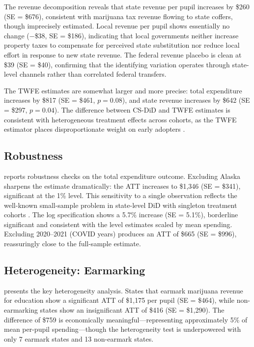 \documentclass[12pt]{article}
\begin{document}
The revenue decomposition reveals that state revenue per pupil increases by \$260 (SE = \$676), consistent with marijuana tax revenue flowing to state coffers, though imprecisely estimated. Local revenue per pupil shows essentially no change ($-$\$38, SE = \$186), indicating that local governments neither increase property taxes to compensate for perceived state substitution nor reduce local effort in response to new state revenue. The federal revenue placebo is clean at \$39 (SE = \$40), confirming that the identifying variation operates through state-level channels rather than correlated federal transfers.

The TWFE estimates are somewhat larger and more precise: total expenditure increases by \$817 (SE = \$461, $p = 0.08$), and state revenue increases by \$642 (SE = \$297, $p = 0.04$). The difference between CS-DiD and TWFE estimates is consistent with heterogeneous treatment effects across cohorts, as the TWFE estimator places disproportionate weight on early adopters \citep{goodman2021difference}.

\subsection{Robustness}



 reports robustness checks on the total expenditure outcome. Excluding Alaska sharpens the estimate dramatically: the ATT increases to \$1,346 (SE = \$341), significant at the 1\% level. This sensitivity to a single observation reflects the well-known small-sample problem in state-level DiD with singleton treatment cohorts \citep{conley2011inference}. The log specification shows a 5.7\% increase (SE = 5.1\%), borderline significant and consistent with the level estimates scaled by mean spending. Excluding 2020--2021 (COVID years) produces an ATT of \$665 (SE = \$996), reassuringly close to the full-sample estimate.

\subsection{Heterogeneity: Earmarking}



 presents the key heterogeneity analysis. States that earmark marijuana revenue for education show a significant ATT of \$1,175 per pupil (SE = \$464), while non-earmarking states show an insignificant ATT of \$416 (SE = \$1,290). The difference of \$759 is economically meaningful---representing approximately 5\% of mean per-pupil spending---though the heterogeneity test is underpowered with only 7 earmark states and 13 non-earmark states.
\end{document}

